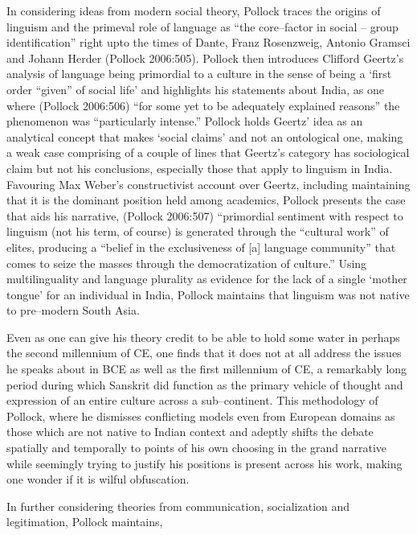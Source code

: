 In considering ideas from modern social theory, Pollock traces the origins of linguism and the primeval role of language as “the core–factor in social – group identification” right upto the times of Dante, Franz Rosenzweig, Antonio Gramsci and Johann Herder (Pollock 2006:505). Pollock then introduces Clifford Geertz’s analysis of language being primordial to a culture in the sense of being a ‘first order “given” of social life’ and highlights his statements about India, as one where (Pollock 2006:506) “for some yet to be adequately explained reasons” the phenomenon was “particularly intense.” Pollock holds Geertz’ idea as an analytical concept that makes ‘social claims’ and not an ontological one, making a weak case comprising of a couple of lines that Geertz’s category has sociological claim but not his conclusions, especially those that apply to linguism in India. Favouring Max Weber’s constructivist account over Geertz, including maintaining that it is the dominant position held among academics, Pollock presents the case that aids his narrative, (Pollock 2006:507) “primordial sentiment with respect to linguism (not his term, of course) is generated through the “cultural work” of elites, producing a “belief in the exclusiveness of [a] language community” that comes to seize the masses through the democratization of culture.” Using multilinguality and language plurality as evidence for the lack of a single ‘mother tongue’ for an individual in India, Pollock maintains that linguism was not native to pre–modern South Asia.

Even as one can give his theory credit to be able to hold some water in perhaps the second millennium of CE, one finds that it does not at all address the issues he speaks about in BCE as well as the first millennium of CE, a remarkably long period during which Sanskrit did function as the primary vehicle of thought and expression of an entire culture across a sub–continent. This methodology of Pollock, where he dismisses conflicting models even from European domains as those which are not native to Indian context and adeptly shifts the debate spatially and temporally to points of his own choosing in the grand narrative while seemingly trying to justify his positions is present across his work, making one wonder if it is wilful obfuscation.

In further considering theories from communication, socialization and legitimation, Pollock maintains,

